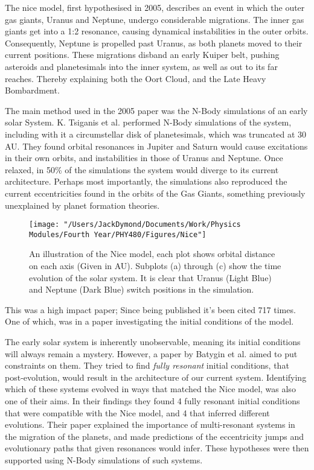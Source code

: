 \documentclass[a4paper,10pt]{article}
\begin{document}
The nice model, first hypothesised in 2005\cite{Nice}, describes an event in which the outer gas giants, Uranus and Neptune, undergo considerable migrations. The inner gas giants get into a 1:2 resonance, causing dynamical instabilities in the outer orbits. Consequently, Neptune is propelled past Uranus, as both planets moved to their current positions. These migrations disband an early Kuiper belt, pushing asteroids and planetesimals into the inner system, as well as out to its far reaches. Thereby explaining both the Oort Cloud, and the Late Heavy Bombardment. 

The main method used in the 2005 paper was the N-Body simulations of an early solar System. K. Tsiganis et al. performed N-Body simulations of the system, including with it a circumstellar disk of planetesimals, which was truncated at 30 AU. They found orbital resonances in Jupiter and Saturn would cause excitations in their own orbits, and instabilities in those of Uranus and Neptune. Once relaxed, in 50\% of the simulations the system would diverge to its current architecture. Perhaps most importantly, the simulations also reproduced the current eccentricities found in the orbits of the Gas Giants, something previously unexplained by planet formation theories.

\begin{figure}[h!]
\centering
\texttt{[image: "/Users/JackDymond/Documents/Work/Physics Modules/Fourth Year/PHY480/Figures/Nice"]}
\caption{An illustration of the Nice model, each plot shows orbital distance on each axis (Given in AU). Subplots (a) through (c) show the time evolution of the solar system. It is clear that Uranus (Light Blue) and Neptune (Dark Blue) switch positions in the simulation.}
\label{NiceFig}
\end{figure}

This was a high impact paper; Since being published it's been cited 717 times. One of which, was in a paper investigating the initial conditions of the model. 

The early solar system is inherently unobservable, meaning its initial conditions will always remain a mystery. However, a paper by Batygin et al. aimed to put constraints on them\cite{Initial}. They tried to find \textit{fully resonant} initial conditions, that post-evolution, would result in the architecture of our current system. Identifying which of these systems evolved in ways that matched the Nice model, was also one of their aims. In their findings they found 4 fully resonant initial conditions that were compatible with the Nice model, and 4 that inferred different evolutions. Their paper explained the importance of multi-resonant systems in the migration of the planets, and made predictions of the eccentricity jumps and evolutionary paths that given resonances would infer. These hypotheses were then supported using N-Body simulations of such systems.
\end{document}
